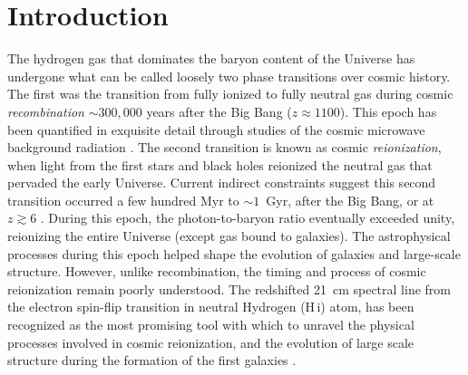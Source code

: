 \documentclass[
reprint,
superscriptaddress,
amsmath,
amssymb,
aps,
prd
]{revtex4-1}
\newcommand{\HI}{H\,{\sc i}}
\begin{document}
\pacs{}%


\maketitle


\section{Introduction}\label{sec:intro}

The hydrogen gas that dominates the baryon content of the Universe has undergone what can be called loosely two phase transitions over cosmic history. The first was the transition from fully ionized to fully neutral gas during cosmic \emph{recombination\/} $\sim 300,000$ years after the Big Bang ($z\approx 1100$). This epoch has been quantified in exquisite detail through studies of the cosmic microwave background radiation \cite{planck15i}. The second transition is known as cosmic \emph{reionization}, when light from the first stars and black holes reionized the neutral gas that pervaded the early Universe. Current indirect constraints suggest this second transition occurred a few hundred Myr to $\sim 1$~Gyr, after the Big Bang, or at $z\gtrsim 6$ \cite{gre17}. During this epoch, the photon-to-baryon ratio eventually exceeded unity, reionizing the entire Universe (except gas bound to galaxies). The astrophysical processes during this epoch helped shape the evolution of galaxies and large-scale structure. However, unlike recombination, the timing and process of cosmic reionization remain poorly understood.  The redshifted 21~cm spectral line from the electron spin-flip transition in neutral Hydrogen (\HI) atom, has been recognized as the most promising tool with which to unravel the physical processes involved in cosmic reionization, and the evolution of large scale structure during the formation of the first galaxies \cite{sun72,sco90,mad97,toz00,ili02,fan02,fan06,bar07,mor10}.
\end{document}
